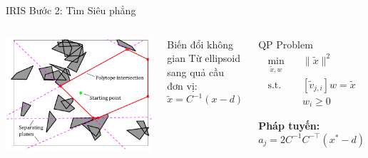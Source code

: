 \documentclass[aspectratio=169]{beamer}
\begin{document}
\begin{frame}{IRIS Bước 2: Tìm Siêu phẳng}
    \begin{columns}[c]
        \includegraphics[width=\textwidth]{imgs/iris_algo_1.png}

        \begin{block}{Biến đổi không gian}
            \small
            Từ ellipsoid sang quả cầu đơn vị:
            \[
                \tilde{x} = C^{-1}(x - d)
            \]
        \end{block}

        \begin{block}{QP Problem}
            \small
            \[
                \begin{aligned}
                    \min_{\tilde{x}, w} \quad & \|\tilde{x}\|^2                \\
                    \text{s.t.} \quad         & [\tilde{v}_{j,i}]w = \tilde{x} \\
                                              & w_i \geq 0
                \end{aligned}
            \]

            \textbf{Pháp tuyến:}
            \[
                a_j = 2C^{-1}C^{-\top}(x^* - d)
            \]
        \end{block}
    \end{columns}
\end{frame}
\end{document}

